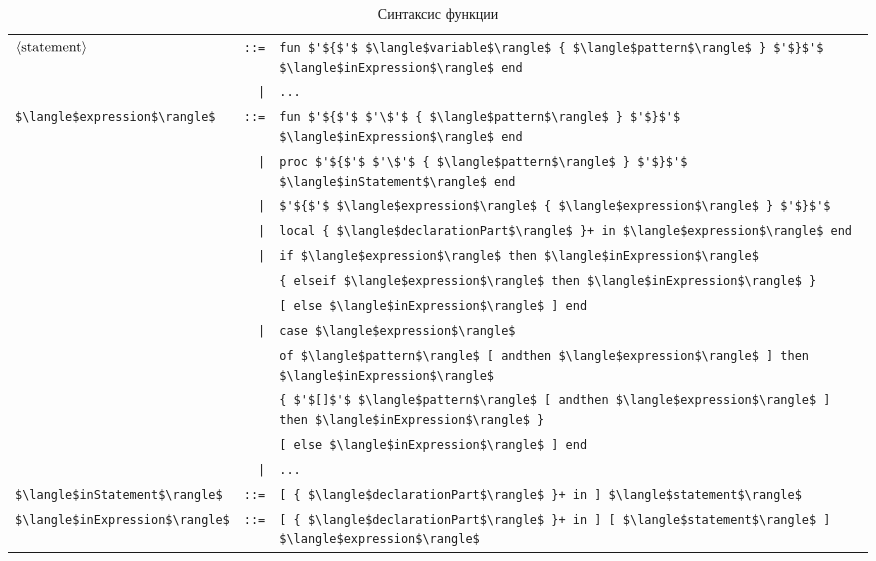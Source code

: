 \begin{table}
  \begin{tabular}{|lrl|}
    \hline
    $\langle \text{\lstinline|statement|} \rangle$ & \lstinline|::=| & \lstinline|fun $'${$'$ $\langle$variable$\rangle$ { $\langle$pattern$\rangle$ } $'$}$'$ $\langle$inExpression$\rangle$ end|\\
    & \lstinline!|!& \lstinline|...|\\
    \lstinline|$\langle$expression$\rangle$| & \lstinline|::=| & \lstinline|fun $'${$'$ $'\$'$ { $\langle$pattern$\rangle$ } $'$}$'$ $\langle$inExpression$\rangle$ end| \\
    & \lstinline!|!& \lstinline|proc $'${$'$ $'\$'$ { $\langle$pattern$\rangle$ } $'$}$'$ $\langle$inStatement$\rangle$ end| \\
    & \lstinline!|!& \lstinline|$'${$'$ $\langle$expression$\rangle$ { $\langle$expression$\rangle$ } $'$}$'$| \\
    & \lstinline!|!& \lstinline|local { $\langle$declarationPart$\rangle$ }+ in $\langle$expression$\rangle$ end| \\
    & \lstinline!|!& \lstinline|if $\langle$expression$\rangle$ then $\langle$inExpression$\rangle$| \\
    & & \lstinline|{ elseif $\langle$expression$\rangle$ then $\langle$inExpression$\rangle$ }| \\
    & & \lstinline|[ else $\langle$inExpression$\rangle$ ] end| \\
    & \lstinline!|!& \lstinline|case $\langle$expression$\rangle$| \\
    & & \lstinline|of $\langle$pattern$\rangle$ [ andthen $\langle$expression$\rangle$ ] then $\langle$inExpression$\rangle$| \\
    & & \lstinline|{ $'$[]$'$ $\langle$pattern$\rangle$ [ andthen $\langle$expression$\rangle$ ] then $\langle$inExpression$\rangle$ }| \\
    & & \lstinline|[ else $\langle$inExpression$\rangle$ ] end| \\
    & \lstinline!|!& \lstinline|...| \\
    \lstinline|$\langle$inStatement$\rangle$| & \lstinline|::=| & \lstinline|[ { $\langle$declarationPart$\rangle$ }+ in ] $\langle$statement$\rangle$| \\
    \lstinline|$\langle$inExpression$\rangle$| & \lstinline|::=| & \lstinline|[ { $\langle$declarationPart$\rangle$ }+ in ] [ $\langle$statement$\rangle$ ] $\langle$expression$\rangle$| \\
    \hline
  \end{tabular}
\caption{Синтаксис функции}
\label{table:function_syntax}
\end{table}



